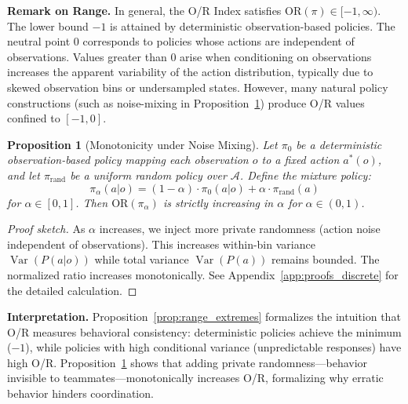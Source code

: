 \documentclass[twoside]{article}
\DeclareMathOperator{\Var}{Var}
\newtheorem{proposition}{Proposition}
\theoremstyle{remark}
\begin{document}
\textbf{Remark on Range.} In general, the O/R Index satisfies $\mathrm{OR}(\pi) \in [-1, \infty)$. The lower bound $-1$ is attained by deterministic observation-based policies. The neutral point $0$ corresponds to policies whose actions are independent of observations. Values greater than $0$ arise when conditioning on observations increases the apparent variability of the action distribution, typically due to skewed observation bins or undersampled states. However, many natural policy constructions (such as noise-mixing in Proposition~\ref{prop:monotonicity_noise}) produce O/R values confined to $[-1, 0]$.

\begin{proposition}[Monotonicity under Noise Mixing]
\label{prop:monotonicity_noise}
Let $\pi_0$ be a deterministic observation-based policy mapping each observation $o$ to a fixed action $a^*(o)$, and let $\pi_{\mathrm{rand}}$ be a uniform random policy over $\mathcal{A}$. Define the mixture policy:
\begin{equation}
\pi_\alpha(a|o) = (1-\alpha) \cdot \pi_0(a|o) + \alpha \cdot \pi_{\mathrm{rand}}(a)
\end{equation}
for $\alpha \in [0, 1]$. Then $\mathrm{OR}(\pi_\alpha)$ is strictly increasing in $\alpha$ for $\alpha \in (0, 1)$.
\end{proposition}

\begin{proof}[Proof sketch]
As $\alpha$ increases, we inject more private randomness (action noise independent of observations). This increases within-bin variance $\Var(P(a|o))$ while total variance $\Var(P(a))$ remains bounded. The normalized ratio increases monotonically. See Appendix~\ref{app:proofs_discrete} for the detailed calculation.
\end{proof}

\textbf{Interpretation.} Proposition~\ref{prop:range_extremes} formalizes the intuition that O/R measures behavioral consistency: deterministic policies achieve the minimum ($-1$), while policies with high conditional variance (unpredictable responses) have high O/R. Proposition~\ref{prop:monotonicity_noise} shows that adding private randomness—behavior invisible to teammates—monotonically increases O/R, formalizing why erratic behavior hinders coordination.
\end{document}
